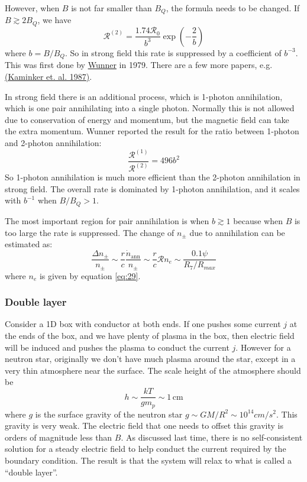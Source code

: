 \documentclass[letterpaper, 11pt]{article}
\numberwithin{equation}{section}
\numberwithin{figure}{section}
\begin{document}
However, when $B$ is not far smaller than $B_Q$, the formula needs to be changed. If $B \gtrsim 2B_Q$, we have
\begin{equation}
    \label{eq:31}
    \mathcal{R}^{(2)} = \frac{1.74 \mathcal{R}_0}{b^3}\exp \left( -\frac{2}{b} \right)
\end{equation}
where $b = B/B_Q$. So in strong field this rate is suppressed by a coefficient of $b^{-3}$. This was first done by \href{http://adsabs.harvard.edu/abs/1979PhRvL..42...79W}{Wunner} in 1979. There are a few more papers, e.g. \href{http://adsabs.harvard.edu/abs/1987Ap%26SS.138....1K}{(Kaminker et. al. 1987)}.

In strong field there is an additional process, which is 1-photon annihilation, which is one pair annihilating into a single photon. Normally this is not allowed due to conservation of energy and momentum, but the magnetic field can take the extra momentum. Wunner reported the result for the ratio between 1-photon and 2-photon annihilation:
\begin{equation}
    \label{eq:32}
    \frac{\mathcal{R}^{(1)}}{\mathcal{R}^{(2)}} = 496b^{2}
\end{equation}
So 1-photon annihilation is much more efficient than the 2-photon annihilation in strong field. The overall rate is dominated by 1-photon annihilation, and it scales with $b^{-1}$ when $B/B_Q>1$.

The most important region for pair annihilation is when $b\gtrsim 1$ because when $B$ is too large the rate is suppressed. The change of $n_\pm$ due to annihilation can be estimated as:
\begin{equation}
    \label{eq:33}
    \frac{\Delta n_\pm}{n_\pm} \sim \frac{r}{c}\frac{\dot{n}_\mathrm{ann}}{n_\pm} \sim \frac{r}{c}\mathcal{R}n_e \sim \frac{0.1\psi}{R_7/R_{max}}
\end{equation}
where $n_e$ is given by equation \eqref{eq:29}.

\subsubsection{Double layer}
\label{sec:double-layer}

Consider a 1D box with conductor at both ends. If one pushes some current $j$ at the ends of the box, and we have plenty of plasma in the box, then electric field will be induced and pushes the plasma to conduct the current $j$. However for a neutron star, originally we don't have much plasma around the star, except in a very thin atmosphere near the surface. The scale height of the atmosphere should be
\begin{equation}
    \label{eq:34}
    h \sim \frac{kT}{gm_p} \sim 1\,\mathrm{cm}
\end{equation}
where $g$ is the surface gravity of the neutron star $g \sim GM/R^2 \sim 10^{14}cm/s^2$. This gravity is very weak. The electric field that one needs to offset this gravity is orders of magnitude less than $B$. As discussed last time, there is no self-consistent solution for a steady electric field to help conduct the current required by the boundary condition. The result is that the system will relax to what is called a ``double layer''.
\end{document}
